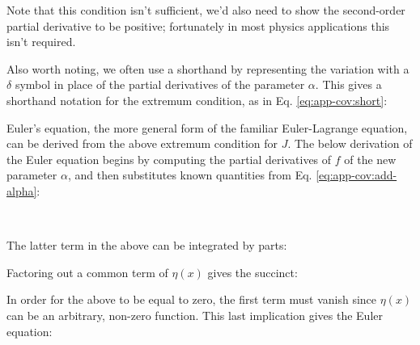 Note that this condition isn't sufficient, we'd also need to show the second-order partial derivative to be positive; fortunately in most physics applications this isn't required. %

Also worth noting, we often use a shorthand by representing the variation with a $\delta$ symbol in place of the partial derivatives of the parameter $\alpha$. This gives a shorthand notation for the extremum condition, as in Eq. \ref{eq:app-cov:short}:

\newpage
Euler's equation, the more general form of the familiar Euler-Lagrange equation, can be derived from the above extremum condition for $J$. The below derivation of the Euler equation begins by computing the partial derivatives of $f$ of the new parameter $\alpha$, and then substitutes known quantities from Eq. \ref{eq:app-cov:add-alpha}:


\

The latter term in the above can be integrated by parts:


Factoring out a common term of $\eta(x)$ gives the succinct:


In order for the above to be equal to zero, the first term must vanish since $\eta(x)$ can be an arbitrary, non-zero function. This last implication gives the Euler equation:


